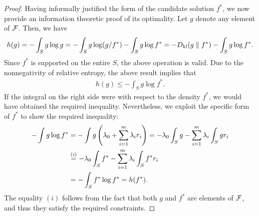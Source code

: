 \begin{proof}
            Having informally justified the form of the candidate solution $f^*$, we now provide an information theoretic proof of its optimality. Let $g$ denote any element of $\mathcal{F}$. Then, we have 
            \begin{align}
                h(g) = - \int_{S} g \log g = - \int_S g \log(g/f^*) - \int_{S} g \log f^* = -D_{\text{kl}}(g\parallel f^*) - \int_S g\log f^*. 
            \end{align}
            Since $f^*$ is supported on the entire $S$, the above operation is valid. Due to the nonnegativity of relative entropy, the above result implies that 
            \begin{align}
                h(g) \leq - \int_S g \log f^*. 
            \end{align}
            If the integral on the right side were with respect to the density $f^*$, we would have obtained the required inequality. Nevertheless, we exploit the specific form of $f^*$ to show the required inequality: 
            \begin{align}
                -\int g \log f^* &= - \int g \left( \lambda_0 + \sum_{i=1}^m \lambda_i r_i \right) = -\lambda_0 \int_S g  - \sum_{i=1}^m \lambda_i \int_S g r_i \\
                & \stackrel{(i)}{=}  -\lambda_0 \int_S f^*  - \sum_{i=1}^m \lambda_i \int_S f^* r_i \\ 
                & = - \int_S f^* \log f^* = h(f^*). 
            \end{align}
             The equality $(i)$ follows from the fact that both $g$ and $f^*$ are elements of $\mathcal{F}$, and thus they satisfy the required constraints. 
        \end{proof}

